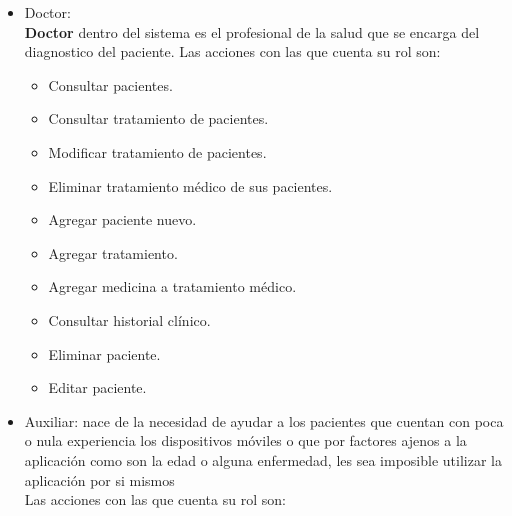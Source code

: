 \begin{itemize}
	\item Doctor: \\ \textbf{Doctor} dentro del sistema es el profesional de la salud que se encarga del diagnostico del paciente.
	Las acciones con las que cuenta su rol son:
		\begin{itemize}
			
			\item Consultar pacientes.
			\item Consultar tratamiento de pacientes.
			\item Modificar tratamiento de pacientes.
			\item Eliminar tratamiento médico de sus pacientes.
			\item Agregar paciente nuevo.
			\item Agregar tratamiento.
			\item Agregar medicina a tratamiento médico.
			\item Consultar historial clínico.
			\item Eliminar paciente.
			\item Editar paciente.
			
		\end{itemize}

	\item Auxiliar: nace de la necesidad de ayudar a los pacientes que cuentan con poca o nula experiencia los dispositivos móviles o que por factores ajenos a la aplicación como son la edad o alguna enfermedad, les sea imposible utilizar la aplicación por si mismos\\
	Las acciones con las que cuenta su rol son:
	\begin{itemize}
		

\end{itemize}
\end{itemize}
